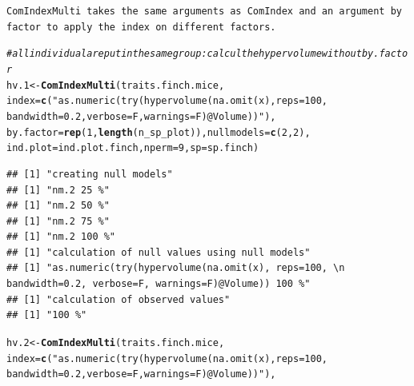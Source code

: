 \documentclass[12pt]{article}\usepackage[]{graphicx}\usepackage[]{color}
\makeatletter
\newcommand{\hlnum}[1]{\textcolor[rgb]{0.686,0.059,0.569}{#1}}%
\newcommand{\hlstr}[1]{\textcolor[rgb]{0.192,0.494,0.8}{#1}}%
\newcommand{\hlcom}[1]{\textcolor[rgb]{0.678,0.584,0.686}{\textit{#1}}}%
\newcommand{\hlstd}[1]{\textcolor[rgb]{0.345,0.345,0.345}{#1}}%
\newcommand{\hlkwb}[1]{\textcolor[rgb]{0.69,0.353,0.396}{#1}}%
\newcommand{\hlkwc}[1]{\textcolor[rgb]{0.333,0.667,0.333}{#1}}%
\newcommand{\hlkwd}[1]{\textcolor[rgb]{0.737,0.353,0.396}{\textbf{#1}}}%
\newenvironment{kframe}{%
 \def\at@end@of@kframe{}%
 \ifinner\ifhmode%
  \def\at@end@of@kframe{\end{minipage}}%
  \begin{minipage}{\columnwidth}%
 \fi\fi%
 \def\FrameCommand##1{\hskip\@totalleftmargin \hskip-\fboxsep
 \colorbox{shadecolor}{##1}\hskip-\fboxsep
     \hskip-\linewidth \hskip-\@totalleftmargin \hskip\columnwidth}%
 \MakeFramed {\advance\hsize-\width
   \@totalleftmargin\z@ \linewidth\hsize
   \@setminipage}}%
 {\par\unskip\endMakeFramed%
 \at@end@of@kframe}
\newenvironment{knitrout}{}{} %
\makeatother
\begin{document}
\begin{knitrout}
\begin{kframe}
{\ttfamily\noindent\itshape\color{messagecolor}{\#\# Demo does not run by default to meet CRAN runtime requirements.\\\#\# This demo requires approximately 3 minutes to run.\\\#\# To run the demo, type\\\#\# 	doHypervolumeFinchDemo=TRUE\\\#\# 	demo(finch)\\\#\# at the R command line prompt.}}\end{kframe}
\end{knitrout}

\tt{ComIndexMulti} takes the same arguments as \tt{ComIndex} and an argument by factor to apply the index on different factors.

\begin{knitrout}
\color{fgcolor}\begin{kframe}
\begin{alltt}
\hlcom{#all individual are put in the same group: calcul the hypervolume without by.factor}
\hlstd{hv.1}\hlkwb{<-}\hlkwd{ComIndexMulti}\hlstd{(traits.finch.mice,}
                          \hlkwc{index}\hlstd{=}\hlkwd{c}\hlstd{(}\hlstr{"as.numeric(try(hypervolume(na.omit(x), reps=100, 
                                  bandwidth=0.2, verbose=F, warnings=F)@Volume))"}\hlstd{),}
                          \hlkwc{by.factor}\hlstd{=}\hlkwd{rep}\hlstd{(}\hlnum{1}\hlstd{,}\hlkwd{length}\hlstd{(n_sp_plot)),} \hlkwc{nullmodels}\hlstd{=}\hlkwd{c}\hlstd{(}\hlnum{2}\hlstd{,}\hlnum{2}\hlstd{),}
                          \hlkwc{ind.plot}\hlstd{=ind.plot.finch,} \hlkwc{nperm}\hlstd{=}\hlnum{9}\hlstd{,} \hlkwc{sp}\hlstd{=sp.finch)}
\end{alltt}
\begin{verbatim}
## [1] "creating null models"
## [1] "nm.2 25 %"
## [1] "nm.2 50 %"
## [1] "nm.2 75 %"
## [1] "nm.2 100 %"
## [1] "calculation of null values using null models"
## [1] "as.numeric(try(hypervolume(na.omit(x), reps=100, \n                                  bandwidth=0.2, verbose=F, warnings=F)@Volume)) 100 %"
## [1] "calculation of observed values"
## [1] "100 %"
\end{verbatim}
\begin{alltt}
\hlstd{hv.2}\hlkwb{<-}\hlkwd{ComIndexMulti}\hlstd{(traits.finch.mice,}
                          \hlkwc{index}\hlstd{=}\hlkwd{c}\hlstd{(}\hlstr{"as.numeric(try(hypervolume(na.omit(x), reps=100, 
                                  bandwidth=0.2, verbose=F, warnings=F)@Volume))"}\hlstd{),}

\end{alltt}
\end{kframe}
\end{knitrout}
\end{document}
